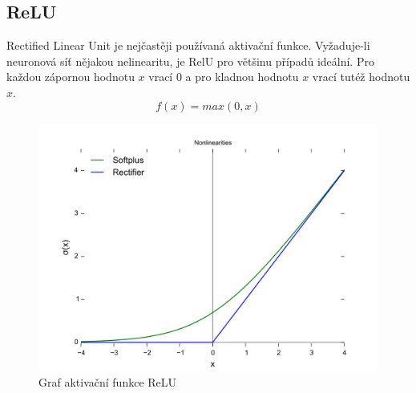 \subsection{ReLU}
Rectified Linear Unit je nejčastěji používaná aktivační funkce. Vyžaduje-li neuronová síť nějakou nelinearitu, je RelU pro většinu případů ideální. Pro každou zápornou hodnotu $x$ vrací $0$ a pro kladnou hodnotu $x$ vrací tutéž hodnotu $x$.
\begin{equation}
   f(x)=max(0,x)
\end{equation}
\begin{figure}[H]
    \centering
    \includegraphics[scale=0.2]{obrazky-figures/ReLU.png}
    \caption{\label{fig:relu}Graf aktivační funkce ReLU}
\end{figure}


